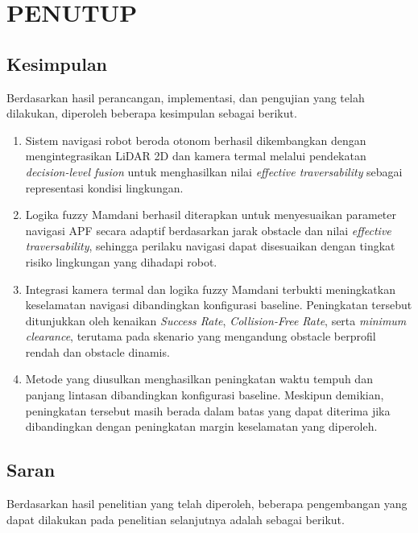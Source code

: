 \chapter{PENUTUP}
\label{chap:penutup}

\section{Kesimpulan}
\label{sec:kesimpulan}

Berdasarkan hasil perancangan, implementasi, dan pengujian yang telah dilakukan, diperoleh beberapa kesimpulan sebagai berikut.

\begin{enumerate}

\item Sistem navigasi robot beroda otonom berhasil dikembangkan dengan mengintegrasikan LiDAR 2D dan kamera termal melalui pendekatan \textit{decision-level fusion} untuk menghasilkan nilai \textit{effective traversability} sebagai representasi kondisi lingkungan.

\item Logika fuzzy Mamdani berhasil diterapkan untuk menyesuaikan parameter navigasi APF secara adaptif berdasarkan jarak obstacle dan nilai \textit{effective traversability}, sehingga perilaku navigasi dapat disesuaikan dengan tingkat risiko lingkungan yang dihadapi robot.

\item Integrasi kamera termal dan logika fuzzy Mamdani terbukti meningkatkan keselamatan navigasi dibandingkan konfigurasi baseline. Peningkatan tersebut ditunjukkan oleh kenaikan \textit{Success Rate}, \textit{Collision-Free Rate}, serta \textit{minimum clearance}, terutama pada skenario yang mengandung obstacle berprofil rendah dan obstacle dinamis.

\item Metode yang diusulkan menghasilkan peningkatan waktu tempuh dan panjang lintasan dibandingkan konfigurasi baseline. Meskipun demikian, peningkatan tersebut masih berada dalam batas yang dapat diterima jika dibandingkan dengan peningkatan margin keselamatan yang diperoleh.

\end{enumerate}

\section{Saran}
\label{chap:saran}

Berdasarkan hasil penelitian yang telah diperoleh, beberapa pengembangan yang dapat dilakukan pada penelitian selanjutnya adalah sebagai berikut.

